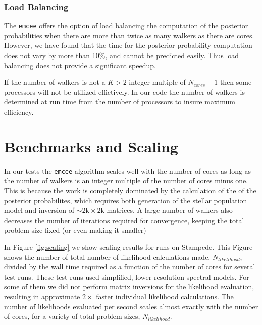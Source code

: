 \documentclass[11pt,preprint]{aastex}
\begin{document}
\subsubsection{Load Balancing}
The \texttt{emcee} offers the option of load balancing the computation of the posterior probabilities when there are more than twice as many walkers as there are cores.  However, we have found that the time for the posterior probability computation does not vary by more than 10\%, and cannot be predicted easily. Thus load balancing does not provide a significant speedup. 

If the number of walkers is not a $K>2$ integer multiple of $N_{cores}-1$ then some processors will not be utilized effictively.  In our code the number of walkers is determined at run time from the number of processors to insure maximum efficiency.

\section{Benchmarks and Scaling}
In our tests the \texttt{emcee} algorithm scales well with the number of cores as long as the number of walkers is an integer multiple of the number of cores minus one.  This is because the work is completely dominated by the calculation of the of the posterior probabilites, which requires both generation of the stellar population model and inversion of $\sim 2\mbox{k} \times 2\mbox{k}$ matrices. A large number of walkers also decreases the number of iterations required for convergence, keeping the total problem size fixed (or even making it smaller)

In Figure \ref{fig:scaling} we show scaling results for runs on Stampede.  This Figure shows the number of total number of likelihood calculations made, $N_{likelihood}$, divided by the wall time required as a function of the number of cores for several test runs.  These test runs used simplified, lower-resolution spectral models.  For some of them we did not perform matrix inversions for the likelihood evaluation, resulting in approximate $2 \times$ faster individual likelihood calculations.  The number of likelihoods evaluated per second scales almost exactly with the number of cores, for a variety of total problem sizes, $N_{likelihood}$.
\end{document}
